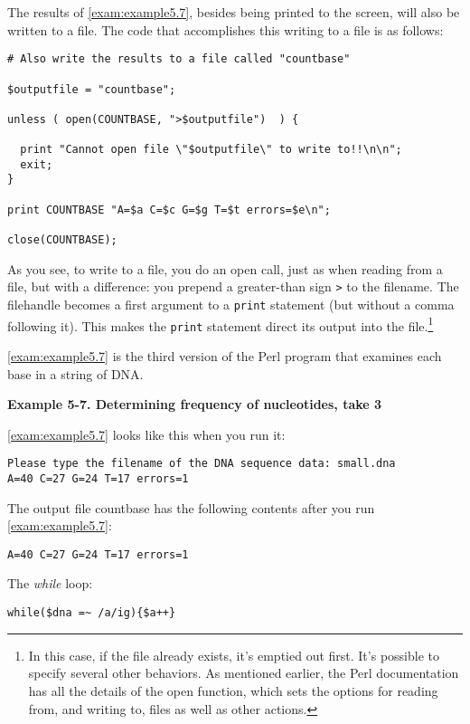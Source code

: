 The results of \autoref{exam:example5.7}, besides being printed to the screen, will also be written to a file. The code that accomplishes this writing to a file is as follows: 

\begin{lstlisting}
# Also write the results to a file called "countbase"

$outputfile = "countbase";

unless ( open(COUNTBASE, ">$outputfile")  ) {

  print "Cannot open file \"$outputfile\" to write to!!\n\n";
  exit;
}

print COUNTBASE "A=$a C=$c G=$g T=$t errors=$e\n";

close(COUNTBASE);
\end{lstlisting}

As you see, to write to a file, you do an open call, just as when reading from a file, but with a difference: you prepend a greater-than sign \verb|>| to the filename. The filehandle becomes a first argument to a \verb|print| statement (but without a comma following it). This makes the \verb|print| statement direct its output into the file.\footnote{In this case, if the file already exists, it's emptied out first. It's possible to specify several other behaviors. As mentioned earlier, the Perl documentation has all the details of the open function, which sets the options for reading from, and writing to, files as well as other actions.}

\autoref{exam:example5.7} is the third version of the Perl program that examines each base in a string of DNA. 

\textbf{Example 5-7. Determining frequency of nucleotides, take 3}


\autoref{exam:example5.7} looks like this when you run it:

\begin{lstlisting}
Please type the filename of the DNA sequence data: small.dna
A=40 C=27 G=24 T=17 errors=1
\end{lstlisting}

The output file countbase has the following contents after you run \autoref{exam:example5.7}:

\begin{lstlisting}
A=40 C=27 G=24 T=17 errors=1
\end{lstlisting}

The \textit{while} loop:

\begin{lstlisting}
while($dna =~ /a/ig){$a++} 
\end{lstlisting}

